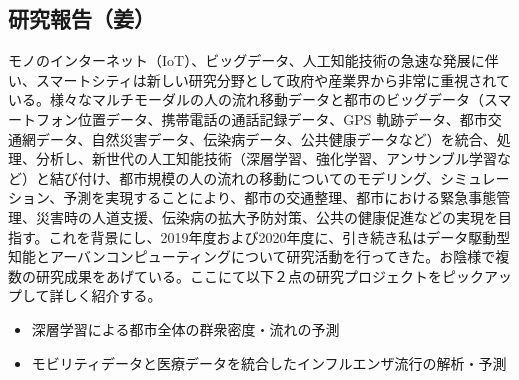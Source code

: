 \subsection{研究報告（姜）}
モノのインターネット（IoT）、ビッグデータ、人工知能技術の急速な発展に伴い、スマートシティは新しい研究分野として政府や産業界から非常に重視されている。様々なマルチモーダルの人の流れ移動データと都市のビッグデータ（スマートフォン位置データ、携帯電話の通話記録データ、GPS 軌跡データ、都市交通網データ、自然災害データ、伝染病データ、公共健康データなど）を統合、処理、分析し、新世代の人工知能技術（深層学習、強化学習、アンサンブル学習など）と結び付け、都市規模の人の流れの移動についてのモデリング、シミュレーション、予測を実現することにより、都市の交通整理、都市における緊急事態管理、災害時の人道支援、伝染病の拡大予防対策、公共の健康促進などの実現を目指す。これを背景にし、2019年度および2020年度に、引き続き私はデータ駆動型知能とアーバンコンピューティングについて研究活動を行ってきた。お陰様で複数の研究成果\cite{JIANG1901,JIANG2001,JIANG2002,JIANG2003,JIANG1902,JIANG1903,JIANG1904,JIANG2004,JIANG2005,JIANG2006}をあげている。ここにて以下２点の研究プロジェクトをピックアップして詳しく紹介する。

\begin{itemize}
    \item 深層学習による都市全体の群衆密度・流れの予測
    \item モビリティデータと医療データを統合したインフルエンザ流行の解析・予測
\end{itemize}

